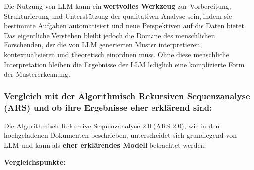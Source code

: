\documentclass[
]{article}
\begin{document}
Die Nutzung von LLM kann ein \textbf{wertvolles Werkzeug} zur
Vorbereitung, Strukturierung und Unterstützung der qualitativen Analyse
sein, indem sie bestimmte Aufgaben automatisiert und neue Perspektiven
auf die Daten bietet. Das eigentliche Verstehen bleibt jedoch die Domäne
des menschlichen Forschenden, der die von LLM generierten Muster
interpretieren, kontextualisieren und theoretisch einordnen muss. Ohne
diese menschliche Interpretation bleiben die Ergebnisse der LLM
lediglich eine komplizierte Form der Mustererkennung.

\subsubsection{\texorpdfstring{\textbf{Vergleich mit der Algorithmisch
Rekursiven Sequenzanalyse (ARS) und ob ihre Ergebnisse eher erklärend
sind:}}{Vergleich mit der Algorithmisch Rekursiven Sequenzanalyse (ARS) und ob ihre Ergebnisse eher erklärend sind:}}\label{vergleich-mit-der-algorithmisch-rekursiven-sequenzanalyse-ars-und-ob-ihre-ergebnisse-eher-erkluxe4rend-sind}

Die Algorithmisch Rekursive Sequenzanalyse 2.0 (ARS 2.0), wie in den
hochgeladenen Dokumenten beschrieben, unterscheidet sich grundlegend von
LLM und kann als \textbf{eher erklärendes Modell} betrachtet werden.

\textbf{Vergleichspunkte:}
\end{document}
